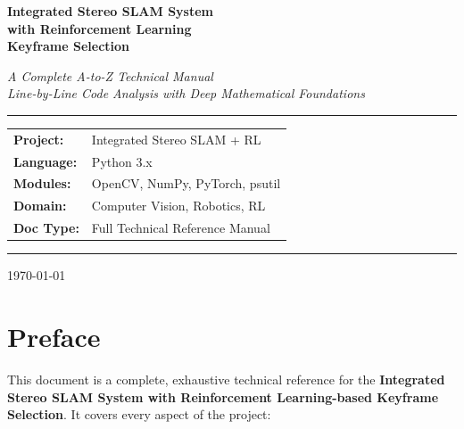 \documentclass[12pt,a4paper,twoside]{report}
\theoremstyle{definition}
\begin{document}
\begin{titlepage}
  \centering
  \vspace*{1.5cm}
  {\Huge\bfseries\color{titleblue}
    Integrated Stereo SLAM System\\[0.4em]
    with Reinforcement Learning\\[0.4em]
    Keyframe Selection\par}
  \vspace{1.5cm}
  {\Large\itshape A Complete A-to-Z Technical Manual\\
   Line-by-Line Code Analysis with Deep Mathematical Foundations\par}
  \vspace{2cm}
  \rule{\linewidth}{1pt}
  \vspace{0.5cm}
  {\large
    \begin{tabular}{ll}
      \textbf{Project:}   & Integrated Stereo SLAM + RL \\
      \textbf{Language:}  & Python 3.x \\
      \textbf{Modules:}   & OpenCV, NumPy, PyTorch, psutil \\
      \textbf{Domain:}    & Computer Vision, Robotics, RL \\
      \textbf{Doc Type:}  & Full Technical Reference Manual \\
    \end{tabular}
  }
  \vspace{0.5cm}
  \rule{\linewidth}{1pt}
  \vfill
  {\large\today}
\end{titlepage}

\tableofcontents
\newpage
\listoffigures
\newpage
\listoftables
\newpage

\chapter*{Preface}

This document is a complete, exhaustive technical reference for the
\textbf{Integrated Stereo SLAM System with Reinforcement Learning-based Keyframe
Selection}. It covers every aspect of the project:
\end{document}
